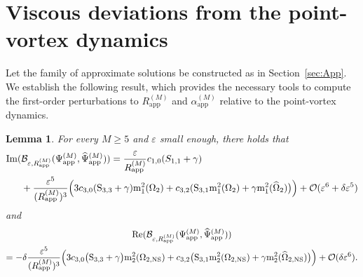 \documentclass[11pt,reqno,a4paper]{amsart}
\def\eps{\varepsilon}
\def\Re{{\rm Re}}
\def\Im{{\rm Im}}
\newcommand{\cB}{\mathcal{B}}
\newcommand{\cO}{\mathcal{O}}
\newcommand{\mrm}{\mathrm{m}}
\newcommand{\1}{\mathbbm{1}}
\newtheorem{lemma}[proposition]{Lemma}
\theoremstyle{definition}
\theoremstyle{definition}
\numberwithin{equation}{section}
\newcommand{\Mapp}[2]{#1^{(#2)}_\mathrm{app}}
\begin{document}
\section{Viscous deviations from the point-vortex dynamics}\label{app:cA}
Let the family of approximate solutions be constructed as in Section~\ref{sec:App}. We establish the following result, which provides the necessary tools to compute the first-order perturbations to $\Mapp{R}{M}$ and $\Mapp{\alpha}{M}$ relative to the point-vortex dynamics.
\begin{lemma}\label{lem:expansionBtot}
    For every $M \ge 5$ and $\eps$ small enough, there holds that
    \begin{align}
         \Im(&\cB_{\eps,\Mapp{R}{M}}(\Mapp{\Psi}{M},\Mapp{\widehat{\Psi}}{M})) = \frac{\eps}{\Mapp{R}{M}} c_{1,0} (S_{1,1}+\gamma) \\& + \frac{\eps^5}{(\Mapp{R}{M})^3} \Big(3c_{3,0}({\rm S}_{3,3}+\gamma) \mrm_1^2(\Omega_2) + c_{3,2} ({\rm S}_{3,1} \mrm_1^2(\Omega_2)+\gamma \mrm_1^2(\widehat{\Omega}_2)\big) \Big) + \cO(\eps^6 + \delta \eps^5)
    \end{align}
    and
    \begin{multline}
        \Re(\cB_{\eps,\Mapp{R}{M}}(\Mapp{\Psi}{M},\Mapp{\widehat{\Psi}}{M})) \\ = -\delta\frac{\eps^5}{(\Mapp{R}{M})^3} \Big( 3c_{3,0} \big( {\rm S}_{3,3}  + \gamma\big) \mrm_2^{2}(\Omega_{2,\mathrm{NS}}) + c_{3,2} \big( {\rm S}_{3,1} \mrm_2^2( \Omega_{2,\mathrm{NS}}) + \gamma \mrm_2^2( \widehat{\Omega}_{2,\mathrm{NS}})\big) \Big) + \cO(\delta \eps^6).
    \end{multline}
\end{lemma}
\end{document}
